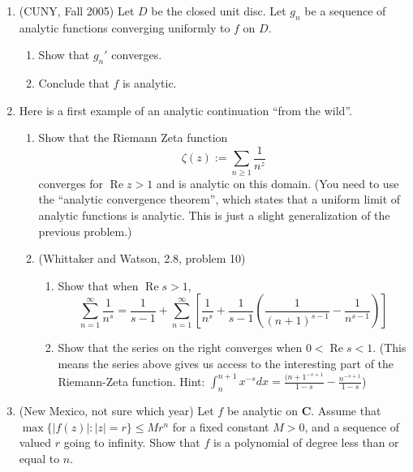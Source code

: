 \documentclass[a4paper,10pt]{article}
\title{}
\author{Dupuy --- Complex Analysis --- Spring 2016 --- Homework 02}
\date{}
\newcommand{\CC}{\mathbf{C}}
\renewcommand{\Re}{\operatorname{Re}}
\begin{document}
\maketitle

\begin{enumerate}
\item (CUNY, Fall 2005)
Let $D$ be the closed unit disc. 
Let $g_n$ be a sequence of analytic functions converging uniformly to $f$ on $D$. 
\begin{enumerate}
\item Show that $g_n'$ converges.
\item Conclude that $f$ is analytic.
\end{enumerate}
\item 
Here is a first example of an analytic continuation ``from the wild''. 
\begin{enumerate}
\item Show that the Riemann Zeta function 
 $$ \zeta(z):=\sum_{n\geq 1} \frac{1}{n^z}$$
converges for $\Re z > 1$ and is analytic on this domain. (You need to use the ``analytic convergence theorem'', which states that a uniform limit of analytic functions is analytic. This is just a slight generalization of the previous problem.)
\item (Whittaker and Watson, 2.8, problem 10) 
 \begin{enumerate}
 \item Show that when $\Re s>1$,
 $$ \sum_{n=1}^{\infty} \frac{1}{n^s} = \frac{1}{s-1} + \sum_{n=1}^{\infty} \left[ \frac{1}{n^s} + \frac{1}{s-1} \left( \frac{1}{(n+1)^{s-1}} - \frac{1}{n^{s-1}} \right) \right]$$
  \item Show that the series on the right converges when $0<\Re s<1$. (This means the series above gives us access to the interesting part of the Riemann-Zeta function. Hint: $ \int_n^{n+1} x^{-s}dx = \frac{(n+1^{-s+1}}{1-s} - \frac{n^{-s+1}}{1-s} $)
\end{enumerate}
\end{enumerate}
\item (New Mexico, not sure which year) %
Let $f$ be analytic on $\CC$. 
Assume that $\max \lbrace \vert f(z) \vert : \vert z \vert = r \rbrace \leq M r^n$ for a fixed constant $M>0$, and a sequence of valued $r$ going to infinity. 
Show that $f$ is a polynomial of degree less than or equal to $n$. 


\end{enumerate}
\end{document}

